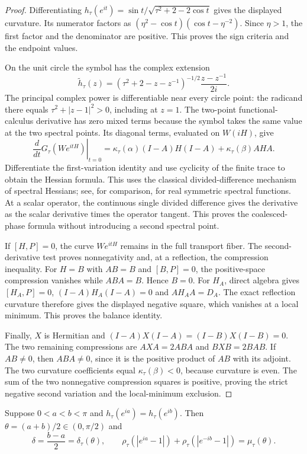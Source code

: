 \begin{proof}
Differentiating
$h_\tau(e^{it})=\sin t/\sqrt{\tau^2+2-2\cos t}$ gives the displayed
curvature. Its numerator factors as
$(\eta^2-\cos t)(\cos t-\eta^{-2})$. Since $\eta>1$, the first
factor and the denominator are positive. This proves the sign criteria
and the endpoint values.

On the unit circle the symbol has the complex extension
\[
 \widetilde h_\tau(z)=
 (\tau^2+2-z-z^{-1})^{-1/2}\frac{z-z^{-1}}{2i}.
\]
The principal complex power is differentiable near every circle point:
the radicand there equals $\tau^2+|z-1|^2>0$, including at $z=1$.
The two-point functional-calculus derivative has zero mixed terms
because the symbol takes the same value at the two spectral points.
Its diagonal terms, evaluated on $W(iH)$, give
\[
 \left.\frac{d}{dt}G_\tau(We^{itH})\right|_{t=0}
 =\kappa_\tau(\alpha)(I-A)H(I-A)+\kappa_\tau(\beta)AHA.
\]
Differentiate the first-variation identity and use cyclicity of the
finite trace to obtain the Hessian formula. This uses the classical
divided-difference mechanism of spectral Hessians; see, for comparison,
\citet[Theorem~3.3]{lewis2001twice} for real symmetric spectral functions.
At a scalar operator, the continuous single divided difference gives
the derivative as the scalar derivative times the operator tangent.
This proves the coalesced-phase formula without introducing a second
spectral point.

If $[H,P]=0$, the curve $We^{itH}$ remains in the full transport fiber.
The second-derivative test proves nonnegativity and, at a reflection,
the compression inequality. For $H=B$ with $AB=B$ and $[B,P]=0$,
the positive-space compression vanishes while $ABA=B$. Hence $B=0$.
For $H_A$, direct algebra gives
$[H_A,P]=0$, $(I-A)H_A(I-A)=0$ and $AH_AA=D_A$.
The exact reflection curvature therefore gives the displayed negative
square, which vanishes at a local minimum. This proves the balance identity.

Finally, $X$ is Hermitian and
$(I-A)X(I-A)=(I-B)X(I-B)=0$.
The two remaining compressions are $AXA=2ABA$ and $BXB=2BAB$.
If $AB\ne0$, then $ABA\ne0$, since it is the positive product of
$AB$ with its adjoint. The two curvature coefficients equal
$\kappa_\tau(\beta)<0$, because curvature is even. The sum of the
two nonnegative compression squares is positive, proving the strict
negative second variation and the local-minimum exclusion.
\end{proof}

\begin{lemma}
\label{lem:smoothed-balanced-phases}
Suppose $0<a<b<\pi$ and $h_\tau(e^{ia})=h_\tau(e^{ib})$.
Then $\theta=(a+b)/2\in(0,\pi/2)$ and
\[
 \delta=\frac{b-a}{2}=\delta_\tau(\theta),\qquad
 \rho_\tau(|e^{ia}-1|)+\rho_\tau(|e^{-ib}-1|)=\mu_\tau(\theta).
\]
\end{lemma}

